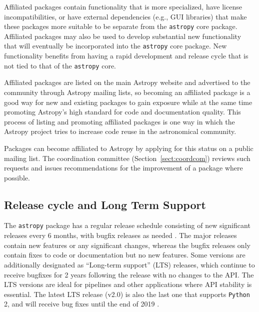 \documentclass[modern]{aastex61}
\newcommand{\package}[1]{\texttt{#1}\xspace}
\newcommand{\python}{\package{Python}}
\newcommand{\astropy}{Astropy\xspace}
\newcommand{\astropypkg}{\package{astropy}}
\newcommand{\sectionname}{Section\xspace}
\begin{document}
Affiliated packages contain functionality that is more specialized,
have license incompatibilities, or have external dependencies (e.g., GUI
libraries) that make these packages more suitable to be separate from the
\astropypkg core package.
Affiliated packages may also be used to develop substantial new functionality
that will eventually be incorporated into the \astropypkg core package.
New functionality benefits from having a rapid development and release cycle that is not tied to that of the \astropypkg core.

Affiliated packages are listed on the main \astropy website and advertised to the community through \astropy mailing lists, so becoming an affiliated package is a good way for new and existing packages to gain exposure while at the same time promoting \astropy's high standard for code and documentation quality. This process of listing and promoting affiliated packages is one way in which the \astropy project tries to increase code reuse in the astronomical community.

Packages can become affiliated to \astropy by applying for this status on a public mailing list. The coordination committee (\sectionname~\ref{sect:coordcom}) reviews such requests and issues recommendations for the improvement of a package where possible.


\subsection{Release cycle and Long Term Support}

The \astropypkg package has a regular release schedule consisting of new significant
releases every 6 months, with bugfix releases as needed \citep{ape2}.
The major releases contain new features or any significant changes, whereas
the bugfix releases only contain fixes to code or documentation but no new
features.
Some versions are additionally designated as ``Long-term support'' (LTS)
releases, which continue to receive bugfixes for 2 years following the release
with no changes to the API\@.
The LTS versions are ideal for pipelines and other applications where API
stability is essential.
The latest LTS release (v2.0) is also the last one that supports \python 2, and
will receive bug fixes until the end of 2019 \citep{ape10}.
\end{document}

